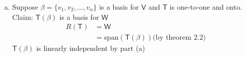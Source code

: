 \begin{enumerate}[(a)]
\begin{equation}
  +\cdots+\mathsf{T}(v_m)\right\}
\end{equation}
Suppose $x \in \text{span}(S)$ such that $x = c_1v_1 + c_2v_2
+\cdots+c_mv_m$
\begin{align}
\implies \mathsf{T}(x) &= \mathsf{T}(c_1v_1+c_2v_n +\cdots+c_mv_m)\\
&= \mathsf{T}(0)\\
&= 0
\end{align}
Because $\mathsf{T}$ is one-to-one.
\begin{equation}
\mathsf{T}(x) =c_1\mathsf{T}(v_1) + c_2\mathsf{T}(v_2) +\cdots+c_m\mathsf{T}(v_m)
\end{equation}
\begin{equation}
\mathsf{T}(v_1)\in\mathsf{T}(S)\; \forall i=1,2,\dots,m
\end{equation}
Therefore $\mathsf{T}(x) \in \text{span}(\mathsf{T}(S))$ and
$\mathsf{T}(S)$ is linearly independent.
\begin{equation}
c_1=c_2=\cdots=c_m=0
\end{equation}
\item Suppose $\beta =\{v_1,v_2,\dots,v_n\}$ is a basis for
  $\mathsf{V}$ and $\mathsf{T}$ is one-to-one and onto.
\\Claim: $\mathsf{T}(\beta)$ is a basis for $\mathsf{W}$
\begin{align}
R\left(\mathsf{T}\right) &=\mathsf{W}\\
&= \text{span}\left(\mathsf{T}(\beta)\right) \text{(by theorem 2.2)}
\end{align}
$\mathsf{T}(\beta)$ is linearly independent by part (a)
\end{enumerate}
